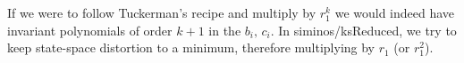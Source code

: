 \begin{description}
If we were to follow Tuckerman's recipe and multiply 
by $r_1^k$ we would indeed have invariant polynomials of order $k+1$ in
the $b_i,\,c_i$. In siminos/ksReduced, we try to keep state-space
distortion to a minimum, therefore multiplying by $r_1$ (or $r_1^2$).



\end{description}
